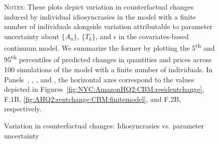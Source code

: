 \documentclass[11pt]{article}
\theoremstyle{definition}
\begin{document}
\begin{figure}[h!]
\caption{Variation in counterfactual changes: Idiosyncrasies vs. parameter uncertainty}
\label{fig:granularity:fixednu}
\label{fig:NYC:AmazonHQ2:parameteruncertainty}
\begin{center}\vspace{-4mm}
\\ \vspace{-2mm}
\\ \vspace{-2mm}
\begin{minipage}{0.96\textwidth}{\footnotesize
\textsc{Notes}:
These plots depict variation in counterfactual changes 
induced by individual idiosyncrasies in the model with a finite number of individuals
alongside
variation attributable to parameter uncertainty about $\{A_n\}$, $\{T_k\}$, and $\epsilon$ in the covariates-based continuum model.
We summarize the former by plotting the 5\textsuperscript{th} and 95\textsuperscript{th} percentiles of predicted changes in quantities and prices across 100 simulations of the model with a finite number of individuals.
In Panels~, , , and ,
the horizontal axes correspond to the values depicted in 
Figures~\ref{fig:NYC:AmazonHQ2:CBM:residentchange}, F.1B, \ref{fig:AHQ2:rentchange:CBM:finitemodel}, and F.2B, respectively.
}
\end{minipage}
\end{center}
\end{figure}
\end{document}
